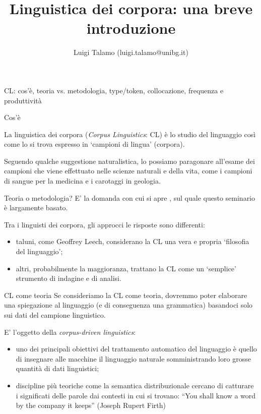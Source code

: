 \documentclass[pdf]{prosper}
\title{Linguistica dei corpora: una breve introduzione}
\author{Luigi Talamo (luigi.talamo@unibg.it)\\ \institution{Dottorato in Scienze Linguistiche: Università degli Studi di Bergamo e Università degli Studi di Pavia}}
\begin{document}
\maketitle

\begin{tsectionandpart}{CL: cos'è, teoria vs. metodologia, type/token, collocazione, frequenza e produttività}

\begin{slide}{Cos'è}

La linguistica dei corpora ({\it Corpus Linguistics}: CL) è lo studio del linguaggio così come lo si trova espresso in `campioni di lingua' (corpora).

Seguendo qualche suggestione naturalistica, lo possiamo paragonare all'esame dei campioni che viene effettuato nelle scienze naturali e della vita, come i campioni di sangue per la medicina e i carotaggi in geologia.

\end{slide}

\begin{slide}{Teoria o metodologia?}
	E' la domanda con cui si apre \citealt{Gries2009}, sul quale questo seminario è largamente basato.

Tra i linguisti dei corpora, gli approcci le risposte sono differenti:

\begin{itemize}
\item taluni, come Geoffrey Leech, considerano la CL una vera e propria `filosofia del linguaggio';
\item altri, probabilmente la maggioranza, trattano la CL come un `semplice' strumento di indagine e di analisi.
\end{itemize}

\end{slide}

\begin{slide}{CL come teoria}
Se consideriamo la CL come teoria, dovremmo poter elaborare una spiegazione al linguaggio (e di conseguenza una grammatica) basandoci solo sui dati del campione linguistico.

E' l'oggetto della {\it corpus-driven linguistics}: 

\begin{itemize}
\item uno dei principali obiettivi del trattamento automatico del linguaggio è quello di insegnare alle macchine il linguaggio naturale somministrando loro grosse quantità di dati linguistici;
\item discipline più teoriche come la semantica distribuzionale cercano di catturare i significati delle parole dai contesti in cui si trovano: ``You shall know a word by the company it keeps'' (Joseph Rupert Firth)
\end{itemize}


\end{slide}
\end{tsectionandpart}
\end{document}
